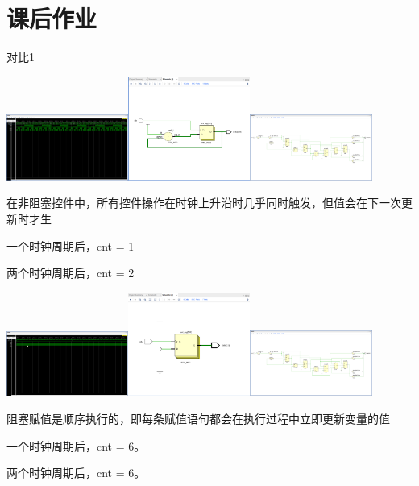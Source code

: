 \documentclass{article} %
\begin{document}
\section{课后作业}
对比1\par
\includegraphics[width=0.3\textwidth]{nonex11.png}\includegraphics[width=0.3\textwidth]{nonex12.png}\includegraphics[width=0.3\textwidth]{nonex13.png}\par
在非阻塞控件中，所有控件操作在时钟上升沿时几乎同时触发，但值会在下一次更新时才生\par
一个时钟周期后，cnt = 1\par
两个时钟周期后，cnt = 2\par

\includegraphics[width=0.3\textwidth]{ex11.png}\includegraphics[width=0.3\textwidth]{ex12.png}\includegraphics[width=0.3\textwidth]{ex13.png}\par
阻塞赋值是顺序执行的，即每条赋值语句都会在执行过程中立即更新变量的值\par
一个时钟周期后，cnt = 6。\par
两个时钟周期后，cnt = 6。\par
\end{document}
